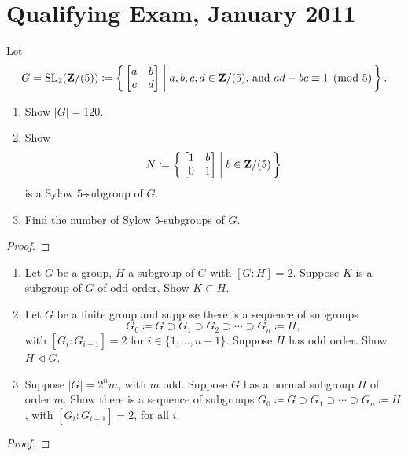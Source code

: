\chapter{Qualifying Exam, January 2011}
\begin{problem}
Let
\[
G=\operatorname{SL}_2(\mathbf{Z}/(5))\coloneqq
\left\{\,\begin{bmatrix}a&b\\c&d\end{bmatrix}\;\middle|\;
\text{$a,b,c,d\in\mathbf{Z}/(5)$, and $ad-bc\equiv 1\pmod{5}$}\,\right\}.
\]
\begin{enumerate}[label=(\alph*)]
\item Show $|G|=120$.
\item Show
\[
N\coloneqq\left\{\,\begin{bmatrix}1&b\\0&1\end{bmatrix}\;\middle|\;b\in\mathbf{Z}/(5)\,\right\}
\]
is a Sylow $5$-subgroup of $G$.
\item Find the number of Sylow $5$-subgroups of $G$.
\end{enumerate}
\end{problem}
\begin{proof}
\end{proof}

\begin{problem}
\begin{enumerate}[label=(\alph*)]
\item Let $G$ be a group, $H$ a subgroup of $G$ with $[G:H]=2$. Suppose $K$
  is a subgroup of $G$ of odd order. Show $K\subset H$.
\item Let $G$ be a finite group and suppose there is a sequence of
  subgroups
\[
  G_0\coloneqq G\supset G_1\supset G_2\supset\cdots\supset  G_n\coloneqq H,
\]
with $[G_i:G_{i+1}]=2$ for $i\in\{1,...,n-1\}$. Suppose $H$ has odd
order. Show $H\lhd G$.
\item Suppose $|G|=2^nm$, with $m$ odd. Suppose $G$ has a normal subgroup
  $H$ of order $m$. Show there is a sequence of subgroups $G_0\coloneqq
  G\supset G_1\supset\cdots\supset G_n\coloneqq H$, with $[G_i:G_{i+1}]=2$,
  for all $i$.
\end{enumerate}
\end{problem}
\begin{proof}
\end{proof}

